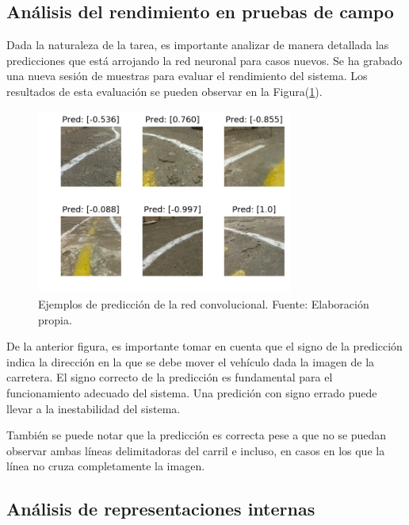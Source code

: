     \subsection{Análisis del rendimiento en pruebas de campo}
    Dada la naturaleza de la tarea, es importante analizar de manera detallada las predicciones que está arrojando la red 
    neuronal para casos nuevos. Se ha grabado una nueva sesión de muestras para evaluar el rendimiento del sistema. Los 
    resultados de esta evaluación se pueden observar en la Figura(\ref{fig:testimg}).

    \begin{figure}[!h] 
        \centering
        \includegraphics[width=0.75\textwidth]{img/testimg}
        \caption[Ejemplos de predicción de la red convolucional]{Ejemplos de predicción de la red convolucional. Fuente: Elaboración propia. }
        \label{fig:testimg}
    \end{figure}

    De la anterior figura, es importante tomar en cuenta que el signo de la predicción indica la dirección en la que se debe 
    mover el vehículo dada la imagen de la carretera. El signo correcto de la predicción es fundamental para el funcionamiento 
    adecuado del sistema. Una predición con signo errado puede llevar a la inestabilidad del sistema. 

    También se puede notar que la predicción es correcta pese a que no se puedan observar ambas líneas delimitadoras del carril 
    e incluso, en casos en los que la línea no cruza completamente la imagen.

    \subsection{Análisis de representaciones internas}\label{sec:representaciones}

